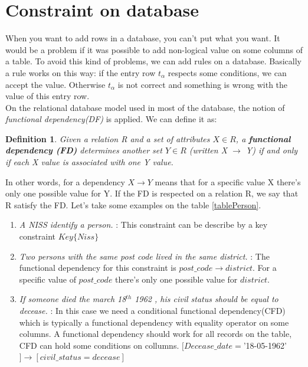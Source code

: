 \documentclass[letterpaper, 12pt]{report}
\newtheorem{mydef}{Definition}
\newcommand{\alinea}{
\hspace*{0.5cm}}
\begin{document}
\newpage

\section{Constraint on database}

\alinea When you want to add rows in a database, you can't put what you want. It would be a problem if it was possible to add non-logical value on some columns of a table. To avoid this kind of problems, we can add rules on a database. Basically a rule works on this way: if the entry row $t_\alpha$ respects some conditions, we can accept the value. Otherwise $t_\alpha$ is not correct and something is wrong with the value of this entry row.\\

On the relational database model used in most of the database, the notion of \emph{functional dependency(DF)} is applied. We can define it as: 

\begin{mydef}
Given a relation R and a set of attributes $X \in R$, a \textbf{functional dependency (FD)} determines another set $Y \in R$ (written X $\rightarrow$ Y) if and only if each X value is associated with one Y value.
\end{mydef} 

In other words, for a dependency $X \rightarrow Y$ means that for a specific value X there's only one possible value for Y. If the FD is respected on a relation R, we say that R satisfy the FD. Let's take some examples on the table \ref{tablePerson}.

\begin{enumerate}
\item \emph{A NISS identify a person.} : This constraint can be describe by a key constraint $Key\{ Niss \}$
\item \emph{Two persons with the same post code lived in the same district.} : The functional dependency for this constraint is $post\_code \rightarrow district$. For a specific value of $post\_code$ there's only one possible value for $district$.
\item \emph{If someone died the march 18$^{th}$ 1962 , his civil status should be equal to decease.} : In this case we need a conditional functional dependency(CFD) which is typically a functional dependency with equality operator on some columns. A functional dependency should work for all records on the table, CFD can hold some conditions on collumns. $[Decease\_date = $'18-05-1962'$] \rightarrow [civil\_status = decease]$
\end{enumerate}
 
\end{document}
